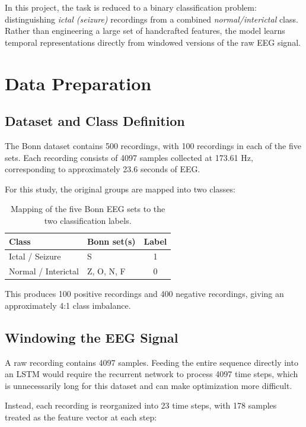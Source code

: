 \documentclass[11pt,a4paper]{article}
\begin{document}
In this project, the task is reduced to a binary classification problem: distinguishing \textit{ictal (seizure)} recordings from a combined \textit{normal/interictal} class. Rather than engineering a large set of handcrafted features, the model learns temporal representations directly from windowed versions of the raw EEG signal.

\section{Data Preparation}

\subsection{Dataset and Class Definition}

The Bonn dataset contains 500 recordings, with 100 recordings in each of the five sets. Each recording consists of 4097 samples collected at 173.61 Hz, corresponding to approximately 23.6 seconds of EEG.

For this study, the original groups are mapped into two classes:

\begin{table}[H]
\centering
\begin{tabular}{@{}llc@{}}
\toprule
\textbf{Class} & \textbf{Bonn set(s)} & \textbf{Label} \\
\midrule
Ictal / Seizure & S & 1 \\
Normal / Interictal & Z, O, N, F & 0 \\
\bottomrule
\end{tabular}
\caption{Mapping of the five Bonn EEG sets to the two classification labels.}
\end{table}

This produces 100 positive recordings and 400 negative recordings, giving an approximately 4:1 class imbalance.

\subsection{Windowing the EEG Signal}

A raw recording contains 4097 samples. Feeding the entire sequence directly into an LSTM would require the recurrent network to process 4097 time steps, which is unnecessarily long for this dataset and can make optimization more difficult.

Instead, each recording is reorganized into 23 time steps, with 178 samples treated as the feature vector at each step:
\end{document}
